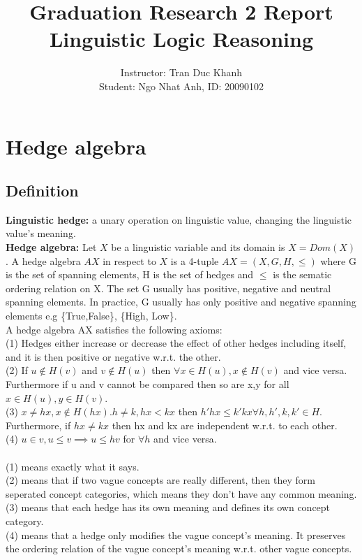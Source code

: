 \documentclass[26pt,fleqn,]{article}
\date{}
\title{Graduation Research 2 Report\\
Linguistic Logic Reasoning}
\author{Instructor: Tran Duc Khanh\\Student: Ngo Nhat Anh, ID: 20090102\\}
\begin{document}
\maketitle
%
\section{Hedge algebra}
\subsection{Definition}
{\bfseries Linguistic hedge:} a unary operation on linguistic value, changing the linguistic value's meaning.
\\
{\bfseries Hedge algebra:} Let \(X\) be a linguistic variable and its domain is \(X = Dom(X)\). A hedge 
algebra \(AX\) in respect to \(X\) is a 4-tuple \(AX = (X,G,H,\le)\) where G is the set of spanning
elements, H is the set of hedges and \(\le\) is the sematic ordering relation on X.
The set G usually has positive, negative and neutral spanning elements. In practice, G usually has only
positive and negative spanning elements e.g \{True,False\}, \{High, Low\}.\\

A hedge algebra AX satisfies the following  axioms:\\
{\indent
	(1) Hedges either increase or decrease the effect of other hedges including itself, and it is 
then positive or negative w.r.t. the other.\\}
{\indent
	(2) If \(u\notin H(v)\) and \(v\notin H(u)\) then \(\forall x\in H(u), x\notin H(v)\) and vice versa. 
	Furthermore if u and v cannot be compared then so are x,y for all \(x\in H(u), y\in H(v)\).
}\\
{\indent
	(3) \(x \not = hx, x \notin H(hx). h\neq k, hx<kx\) then \(h'hx\le k'kx\forall h,h',k,k'\in
	H.\) Furthermore, if \(hx \neq kx\) then hx and kx are independent w.r.t. to each other.
}\\
{\indent
	(4) \(u \in v, u \le v\implies u\le hv\) for \(\forall h\) and vice versa.
}
\\\\
(1) means exactly what it says.\\
(2) means that if two vague concepts are really different, then they form seperated concept categories,
which means they don't have any common meaning.\\
(3) means that each hedge has its own meaning and defines its own concept category.\\
(4) means that a hedge only modifies the vague concept's meaning. It preserves the ordering relation
of the vague concept's meaning w.r.t. other vague concepts.\\
\end{document}
